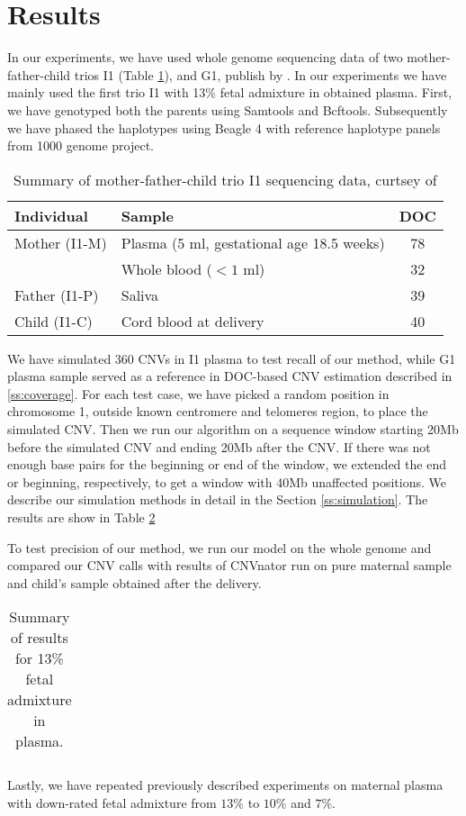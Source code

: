 \section{Results}
In our experiments, we have used whole genome sequencing data of two mother-father-child trios I1 (Table \ref{tab:I1}), and G1, publish by \cite{kitzman2012}. In our experiments we have mainly used the first trio I1 with 13\% fetal admixture in obtained plasma. First, we have genotyped both the parents using Samtools and Bcftools. Subsequently we have phased the haplotypes using Beagle 4 \cite{browning2013} with reference haplotype panels from 1000 genome project.

\begin{table}[t]
\centering
\begin{tabular}{l|l|c}
Individual & Sample & DOC \\ \hline
Mother (I1-M) & Plasma (5 ml, gestational age 18.5 weeks) & 78 \\
	& Whole blood ($<1$ ml) & 32 \\
Father (I1-P) & Saliva & 39 \\
Child (I1-C) & Cord blood at delivery & 40
\end{tabular}
\vspace{3pt}
\caption{Summary of mother-father-child trio I1 sequencing data, curtsey of \cite{kitzman2012}  }
\label{tab:I1} 
\end{table}

We have simulated 360 CNVs in I1 plasma to test recall of our method, while G1 plasma sample served as a reference in DOC-based CNV estimation described in \ref{ss:coverage}. For each test case, we have picked a random position in chromosome 1, outside known centromere and telomeres region, to place the simulated CNV. Then we run our algorithm on a sequence window starting 20Mb before the simulated CNV and ending 20Mb after the CNV. If there was not enough base pairs for the beginning or end of the window, we extended the end or beginning, respectively, to get a window with 40Mb unaffected positions. We describe our simulation methods in detail in the Section \ref{ss:simulation}. The results are show in Table \ref{tab:resff13}

To test precision of our method, we run our model on the whole genome and compared our CNV calls with results of CNVnator \cite{abyzov2011cnvnator} run on pure maternal sample and child's sample obtained after the delivery.

\begin{table}[t]
\centering
{}
\begin{tabular}{l|l|c}
\end{tabular}
\caption{Summary of results for 13\% fetal admixture in plasma. }
\label{tab:resff13} 
\end{table}

Lastly, we have repeated previously described experiments on maternal plasma with down-rated fetal admixture from $13\%$ to $10\%$ and $7\%$.







